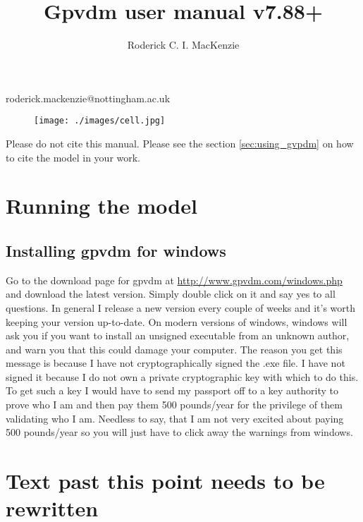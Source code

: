 \documentclass[a4paper,12pt]{article}
\begin{document}
\title{Gpvdm user manual v7.88+}

\author{Roderick C. I. MacKenzie}


\maketitle




\centerline{roderick.mackenzie@nottingham.ac.uk}


\begin{figure}[ht!]
\centering
\texttt{[image: ./images/cell.jpg]}
\label{overflow}
\end{figure}

\newpage
\vspace*{\fill}
Please do not cite this manual.  Please see the section \ref{sec:using_gvpdm} on how to cite the model in your work.
\vspace*{\fill}
\newpage

\newpage

\newpage

\section{Running the model}

\subsection{Installing gpvdm for windows}
Go to the download page for gpvdm at \url{http://www.gpvdm.com/windows.php} and download the latest version.  Simply double click on it and say yes to all questions.  In general I release a new version every couple of weeks and it's worth keeping your version up-to-date. On modern versions of windows, windows will ask you if you want to install an unsigned executable from an unknown author, and warn you that this could damage your computer.  The reason you get this message is because I have not cryptographically signed the .exe file. I have not signed it because I do not own a private cryptographic key with which to do this.  To get such a key I would have to send my passport off to a key authority to prove who I am and then pay them 500 pounds/year for the privilege of them validating who I am.  Needless to say, that I am not very excited about paying 500 pounds/year so you will just have to click away the warnings from windows.











\section{Text past this point needs to be rewritten}






\end{document}
